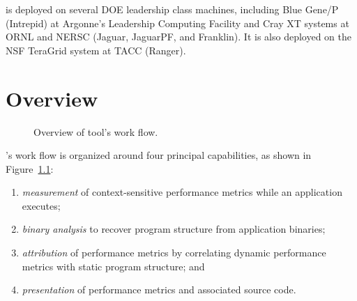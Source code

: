 \documentclass[11pt,letterpaper]{report}
\begin{document}
\HPCToolkit{} is deployed on several DOE leadership class machines, including Blue Gene/P (Intrepid) at Argonne's Leadership Computing Facility and Cray XT systems at ORNL and NERSC (Jaguar, JaguarPF, and Franklin).
It is also deployed on the NSF TeraGrid system at TACC (Ranger).



\chapter{\HPCToolkit{} Overview}

\begin{figure}[t]
\caption{Overview of \HPCToolkit{} tool's work flow.}
\label{fig:hpctoolkit-overview:a}
\end{figure}

\HPCToolkit{}'s work flow is organized around four principal capabilities, as shown in Figure~\ref{fig:hpctoolkit-overview:a}:
\begin{enumerate}
  \item \emph{measurement} of context-sensitive performance metrics while an application executes;
  \item \emph{binary analysis} to recover program structure from application binaries;
  \item \emph{attribution} of performance metrics by correlating dynamic performance metrics with static program structure; and
  \item \emph{presentation} of performance metrics and associated source code.
\end{enumerate}
\end{document}
